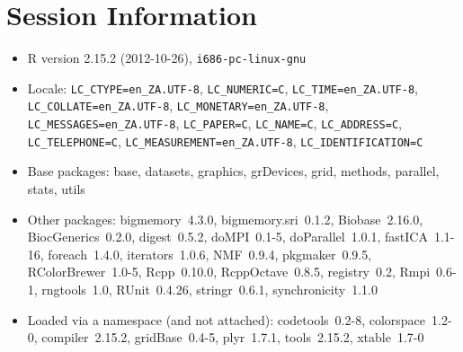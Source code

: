 \documentclass[10pt]{article}
\begin{document}
\section*{Session Information}
\begin{itemize}\raggedright
  \item R version 2.15.2 (2012-10-26), \verb|i686-pc-linux-gnu|
  \item Locale: \verb|LC_CTYPE=en_ZA.UTF-8|, \verb|LC_NUMERIC=C|, \verb|LC_TIME=en_ZA.UTF-8|, \verb|LC_COLLATE=en_ZA.UTF-8|, \verb|LC_MONETARY=en_ZA.UTF-8|, \verb|LC_MESSAGES=en_ZA.UTF-8|, \verb|LC_PAPER=C|, \verb|LC_NAME=C|, \verb|LC_ADDRESS=C|, \verb|LC_TELEPHONE=C|, \verb|LC_MEASUREMENT=en_ZA.UTF-8|, \verb|LC_IDENTIFICATION=C|
  \item Base packages: base, datasets, graphics, grDevices, grid,
    methods, parallel, stats, utils
  \item Other packages: bigmemory~4.3.0, bigmemory.sri~0.1.2,
    Biobase~2.16.0, BiocGenerics~0.2.0, digest~0.5.2, doMPI~0.1-5,
    doParallel~1.0.1, fastICA~1.1-16, foreach~1.4.0, iterators~1.0.6,
    NMF~0.9.4, pkgmaker~0.9.5, RColorBrewer~1.0-5, Rcpp~0.10.0,
    RcppOctave~0.8.5, registry~0.2, Rmpi~0.6-1, rngtools~1.0,
    RUnit~0.4.26, stringr~0.6.1, synchronicity~1.1.0
  \item Loaded via a namespace (and not attached): codetools~0.2-8,
    colorspace~1.2-0, compiler~2.15.2, gridBase~0.4-5, plyr~1.7.1,
    tools~2.15.2, xtable~1.7-0
\end{itemize}
\end{document}
